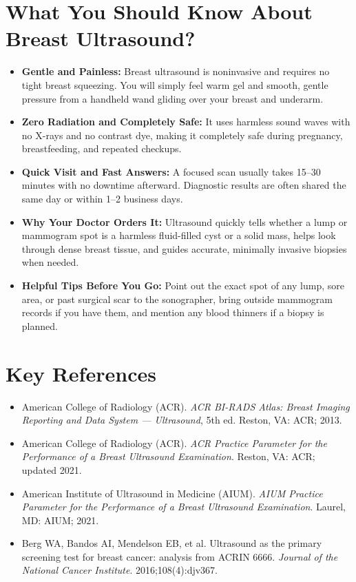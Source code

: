 \section{What You Should Know About Breast Ultrasound?}
\begin{itemize}
\item \textbf{Gentle and Painless:} Breast ultrasound is noninvasive and requires no tight breast squeezing. You will simply feel warm gel and smooth, gentle pressure from a handheld wand gliding over your breast and underarm.
\item \textbf{Zero Radiation and Completely Safe:} It uses harmless sound waves with no X-rays and no contrast dye, making it completely safe during pregnancy, breastfeeding, and repeated checkups.
\item \textbf{Quick Visit and Fast Answers:} A focused scan usually takes 15--30 minutes with no downtime afterward. Diagnostic results are often shared the same day or within 1--2 business days.
\item \textbf{Why Your Doctor Orders It:} Ultrasound quickly tells whether a lump or mammogram spot is a harmless fluid-filled cyst or a solid mass, helps look through dense breast tissue, and guides accurate, minimally invasive biopsies when needed.
\item \textbf{Helpful Tips Before You Go:} Point out the exact spot of any lump, sore area, or past surgical scar to the sonographer, bring outside mammogram records if you have them, and mention any blood thinners if a biopsy is planned.
\end{itemize}

\section{Key References}
\begin{itemize}
\item American College of Radiology (ACR). \textit{ACR BI-RADS Atlas: Breast Imaging Reporting and Data System --- Ultrasound}, 5th ed. Reston, VA: ACR; 2013.
\item American College of Radiology (ACR). \textit{ACR Practice Parameter for the Performance of a Breast Ultrasound Examination}. Reston, VA: ACR; updated 2021.
\item American Institute of Ultrasound in Medicine (AIUM). \textit{AIUM Practice Parameter for the Performance of a Breast Ultrasound Examination}. Laurel, MD: AIUM; 2021.
\item Berg WA, Bandos AI, Mendelson EB, et al. Ultrasound as the primary screening test for breast cancer: analysis from ACRIN 6666. \textit{Journal of the National Cancer Institute}. 2016;108(4):djv367.
\end{itemize}
